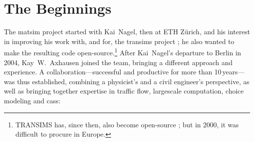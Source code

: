 \section{The Beginnings}
\label{sec:howitstarted}
The \gls{matsim} project \citep[][]{MATSIM_Webpage_2015} started with Kai~Nagel, then at ETH Zürich, and his interest in improving his work with, and for, the \gls{transims} project \citep[][]{SmithEtc1995TRANSIMSSeattle,TRANSIMSFHWA_Webpage_2013}; he also wanted to make the resulting code open-source.\footnote{%
%
TRANSIMS has, since then, also become open-source \citep{TRANSIMSOS_Webpage_2013}; but in 2000, it was difficult to procure in Europe.
%
} After Kai~Nagel's departure to Berlin in 2004, Kay~W.~Axhausen joined the team, bringing a different approach and experience. A collaboration---successful and productive for more than 10\,years---was thus established, combining a physicist's and a civil engineer's perspective, as well as  bringing together expertise in
%
traffic flow,
%
\gls{largescale} computation,
%
choice modeling
%
and
%
\glspl{cas}:
%
%
%
%
%
%
%
